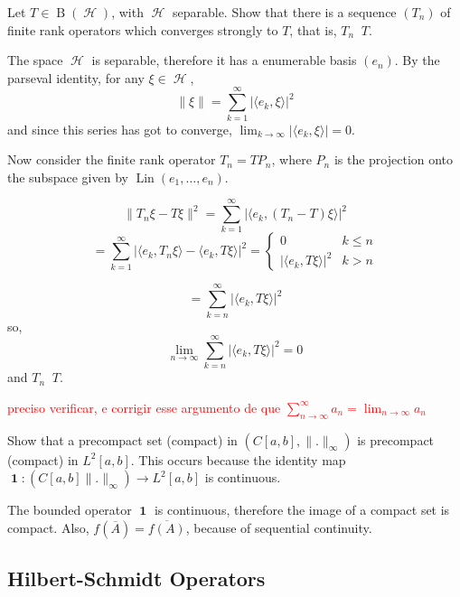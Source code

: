 \documentclass{article}
\theoremstyle{exercisestyle}
\newenvironment{exercise}[1]
  {\renewcommand\theinnerex{#1}\innerex}
  {\endinnerex}
\DeclareMathOperator{\bounded}{B}
\DeclareMathOperator{\hilbert}{\mathcal{H}}
\DeclareMathOperator{\Id}{\textbf{1}}
\DeclareMathOperator{\strongly}{\stackrel{s}{\longrightarrow}}
\DeclareMathOperator{\linspan}{\text{Lin}}
\newcommand{\norm}[1]{\lVert #1 \rVert}
\newcommand{\closure}[1]{\overline{ #1}}
\newcommand{\inner}[2]{\langle #1, #2 \rangle}
\begin{document}
\begin{exercise}{1.3.26}
    Let $T \in \bounded(\hilbert)$, with $\hilbert$ separable. Show that there is a sequence $(T_n)$ of finite rank operators which converges strongly to $T$,
    that is, $T_n \strongly T$.

    The space $\hilbert$ is separable, therefore it has a enumerable basis $(e_n)$. By the parseval identity, for any $\xi \in \hilbert$,
    $$ \norm{\xi} = \sum_{k=1}^\infty |\inner{e_k}{\xi}|^2$$
    and since this series has got to converge, $\lim_{k\to\infty} |\inner{e_k}{\xi}| = 0$.

    Now consider the finite rank operator $T_n = TP_n$, where $P_n$ is the projection onto the subspace given by $\linspan(e_1,\dots,e_n)$.


    $$ \norm{T_n \xi - T\xi}^2 = \sum_{k=1}^\infty |\inner{e_k}{(T_n - T)\xi}|^2$$
    $$ = \sum_{k=1}^\infty |\inner{e_k}{T_n\xi} - \inner{e_k}{T\xi}|^2 =
        \begin{cases}
            0                     & k \leq n \\
            |\inner{e_k}{T\xi}|^2 & k > n
        \end{cases}
    $$

    $$ = \sum_{k=n}^\infty |\inner{e_k}{T\xi}|^2$$
    so,
    $$ \lim_{n \to \infty} \sum_{k=n}^\infty |\inner{e_k}{T\xi}|^2 = 0$$
    and $T_n \strongly T$.

    \textcolor{red}{preciso verificar, e corrigir esse argumento de que $\sum_{n\to\infty}^\infty a_n = \lim_{n\to\infty} a_n$}


\end{exercise}

\begin{exercise}{1.3.31}
    Show that a precompact set (compact) in $(C[a, b], \norm{.}_\infty )$ is precompact (compact) in $L^2[a, b]$. This occurs because the identity map
    $\Id : (C[a, b]\norm{.}_\infty) \to L^2 [a, b]$ is continuous.

    The bounded operator $\Id$ is continuous, therefore the image of a compact set is compact. Also, $f\left(\closure{A}\right) = \closure{f(A)}$, because of sequential continuity.



\end{exercise}

\subsection{Hilbert-Schmidt Operators}
\end{document}
